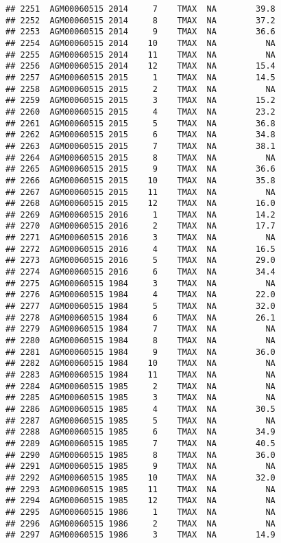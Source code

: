 \documentclass{article}\usepackage[]{graphicx}\usepackage[]{color}
\makeatletter
\newenvironment{kframe}{%
 \def\at@end@of@kframe{}%
 \ifinner\ifhmode%
  \def\at@end@of@kframe{\end{minipage}}%
  \begin{minipage}{\columnwidth}%
 \fi\fi%
 \def\FrameCommand##1{\hskip\@totalleftmargin \hskip-\fboxsep
 \colorbox{shadecolor}{##1}\hskip-\fboxsep
     \hskip-\linewidth \hskip-\@totalleftmargin \hskip\columnwidth}%
 \MakeFramed {\advance\hsize-\width
   \@totalleftmargin\z@ \linewidth\hsize
   \@setminipage}}%
 {\par\unskip\endMakeFramed%
 \at@end@of@kframe}
\newenvironment{knitrout}{}{} %
\makeatother
\begin{document}
\begin{knitrout}
\begin{kframe}
\begin{verbatim}
## 2251  AGM00060515 2014     7    TMAX  NA        39.8
## 2252  AGM00060515 2014     8    TMAX  NA        37.2
## 2253  AGM00060515 2014     9    TMAX  NA        36.6
## 2254  AGM00060515 2014    10    TMAX  NA          NA
## 2255  AGM00060515 2014    11    TMAX  NA          NA
## 2256  AGM00060515 2014    12    TMAX  NA        15.4
## 2257  AGM00060515 2015     1    TMAX  NA        14.5
## 2258  AGM00060515 2015     2    TMAX  NA          NA
## 2259  AGM00060515 2015     3    TMAX  NA        15.2
## 2260  AGM00060515 2015     4    TMAX  NA        23.2
## 2261  AGM00060515 2015     5    TMAX  NA        36.8
## 2262  AGM00060515 2015     6    TMAX  NA        34.8
## 2263  AGM00060515 2015     7    TMAX  NA        38.1
## 2264  AGM00060515 2015     8    TMAX  NA          NA
## 2265  AGM00060515 2015     9    TMAX  NA        36.6
## 2266  AGM00060515 2015    10    TMAX  NA        35.8
## 2267  AGM00060515 2015    11    TMAX  NA          NA
## 2268  AGM00060515 2015    12    TMAX  NA        16.0
## 2269  AGM00060515 2016     1    TMAX  NA        14.2
## 2270  AGM00060515 2016     2    TMAX  NA        17.7
## 2271  AGM00060515 2016     3    TMAX  NA          NA
## 2272  AGM00060515 2016     4    TMAX  NA        16.5
## 2273  AGM00060515 2016     5    TMAX  NA        29.0
## 2274  AGM00060515 2016     6    TMAX  NA        34.4
## 2275  AGM00060515 1984     3    TMAX  NA          NA
## 2276  AGM00060515 1984     4    TMAX  NA        22.0
## 2277  AGM00060515 1984     5    TMAX  NA        32.0
## 2278  AGM00060515 1984     6    TMAX  NA        26.1
## 2279  AGM00060515 1984     7    TMAX  NA          NA
## 2280  AGM00060515 1984     8    TMAX  NA          NA
## 2281  AGM00060515 1984     9    TMAX  NA        36.0
## 2282  AGM00060515 1984    10    TMAX  NA          NA
## 2283  AGM00060515 1984    11    TMAX  NA          NA
## 2284  AGM00060515 1985     2    TMAX  NA          NA
## 2285  AGM00060515 1985     3    TMAX  NA          NA
## 2286  AGM00060515 1985     4    TMAX  NA        30.5
## 2287  AGM00060515 1985     5    TMAX  NA          NA
## 2288  AGM00060515 1985     6    TMAX  NA        34.9
## 2289  AGM00060515 1985     7    TMAX  NA        40.5
## 2290  AGM00060515 1985     8    TMAX  NA        36.0
## 2291  AGM00060515 1985     9    TMAX  NA          NA
## 2292  AGM00060515 1985    10    TMAX  NA        32.0
## 2293  AGM00060515 1985    11    TMAX  NA          NA
## 2294  AGM00060515 1985    12    TMAX  NA          NA
## 2295  AGM00060515 1986     1    TMAX  NA          NA
## 2296  AGM00060515 1986     2    TMAX  NA          NA
## 2297  AGM00060515 1986     3    TMAX  NA        14.9

\end{verbatim}
\end{kframe}
\end{knitrout}
\end{document}
